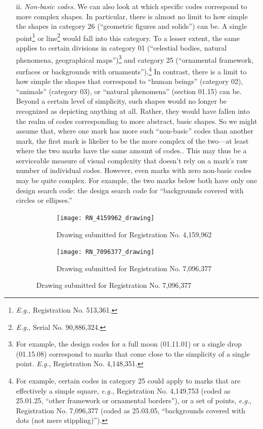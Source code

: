 \documentclass[letterpaper, 11pt, oneside]{article}
\begin{document}
\begin{enumerate}
\item[ii.] \textit{Non-basic codes}. We can also look at which specific codes correspond to more complex shapes. In particular, there is almost no limit to how simple the shapes in category 26 (``geometric figures and solids'') can be. A single point\footnote{\textit{E.g.}, Registration No. 513,361.} or line\footnote{\textit{E.g.}, Serial No. 90,886,324.} would fall into this category. To a lesser extent, the same applies to certain divisions in category 01 (``celestial bodies, natural phenomena, geographical maps'')\footnote{For example, the design codes for a full moon (01.11.01) or a single drop (01.15.08) correspond to marks that come close to the simplicity of a single point. \textit{E.g.}, Registration No. 4,148,351.} and category 25 (``ornamental framework, surfaces or backgrounds with ornaments'').\footnote{For example, certain codes in category 25 could apply to marks that are effectively a simple square, \textit{e.g.}, Registration No. 4,149,753 (coded as 25.01.25, ``other framework or ornamental borders''), or a set of points, \textit{e.g.}, Registration No. 7,096,377 (coded as 25.03.05, ``backgrounds covered with dots (not mere stippling)'').} In contrast, there is a limit to how simple the shapes that correspond to ``human beings'' (category 02), ``animals'' (category 03), or ``natural phenomena'' (section 01.15) can be. Beyond a certain level of simplicity, such shapes would no longer be recognized as depicting anything at all. Rather, they would have fallen into the realm of codes corresponding to more abstract, basic shapes. So we might assume that, where one mark has more such ``non-basic'' codes than another mark, the first mark is likelier to be the more complex of the two—at least where the two marks have the same amount of codes.. This may thus be a serviceable measure of visual complexity that doesn't rely on a mark's raw number of individual codes. However, even marks with zero non-basic codes may be quite complex. For example, the two marks below both have only one design search code: the design search code for ``backgrounds covered with circles or ellipses.''

\begin{figure}[H]
\centering
\begin{subfigure}[h]{0.4\linewidth}
\texttt{[image: RN\_4159962\_drawing]} \
\caption{Drawing submitted for Registration No. 4,159,962}
\end{subfigure}
\hspace{30pt}
\begin{subfigure}[h]{0.275\linewidth}
\texttt{[image: RN\_7096377\_drawing]} \
\caption{Drawing submitted for Registration No. 7,096,377}
\end{subfigure}
\end{figure}
\par



\end{enumerate}
\end{document}
